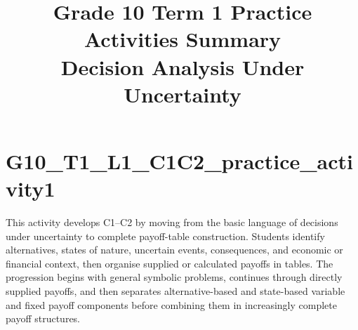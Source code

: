 \makeatletter
{}
\makeatother



\title{Grade 10 Term 1 Practice Activities Summary\\Decision Analysis Under Uncertainty}
\author{}
\date{}


	\maketitle

	\setcounter{tocdepth}{1}
	\setcounter{secnumdepth}{2}
	\label{toc}
	\tableofcontents

	\section{G10\_T1\_L1\_C1C2\_practice\_activity1}
	This activity develops C1--C2 by moving from the basic language of decisions under uncertainty to complete payoff-table construction. Students identify alternatives, states of nature, uncertain events, consequences, and economic or financial context, then organise supplied or calculated payoffs in tables. The progression begins with general symbolic problems, continues through directly supplied payoffs, and then separates alternative-based and state-based variable and fixed payoff components before combining them in increasingly complete payoff structures.

